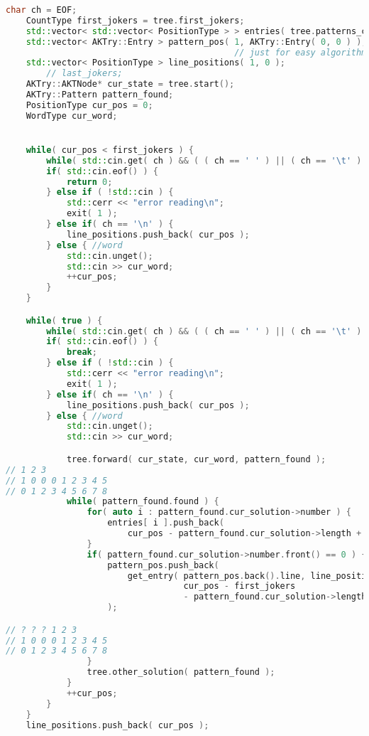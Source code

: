 \begin{lstlisting}[language=C++]
    char ch = EOF;
    CountType first_jokers = tree.first_jokers;
    std::vector< std::vector< PositionType > > entries( tree.patterns_count );
    std::vector< AKTry::Entry > pattern_pos( 1, AKTry::Entry( 0, 0 ) );
                                             // just for easy algorithm
    std::vector< PositionType > line_positions( 1, 0 );
        // last_jokers;
    AKTry::AKTNode* cur_state = tree.start();
    AKTry::Pattern pattern_found;
    PositionType cur_pos = 0;
    WordType cur_word;


    while( cur_pos < first_jokers ) {
        while( std::cin.get( ch ) && ( ( ch == ' ' ) || ( ch == '\t' ) ) );
        if( std::cin.eof() ) {
            return 0;
        } else if ( !std::cin ) {
            std::cerr << "error reading\n";
            exit( 1 );
        } else if( ch == '\n' ) {
            line_positions.push_back( cur_pos );
        } else { //word
            std::cin.unget();
            std::cin >> cur_word;
            ++cur_pos;
        }
    }

    while( true ) {
        while( std::cin.get( ch ) && ( ( ch == ' ' ) || ( ch == '\t' ) ) );
        if( std::cin.eof() ) {
            break;
        } else if ( !std::cin ) {
            std::cerr << "error reading\n";
            exit( 1 );
        } else if( ch == '\n' ) {
            line_positions.push_back( cur_pos );
        } else { //word
            std::cin.unget();
            std::cin >> cur_word;

            tree.forward( cur_state, cur_word, pattern_found );
// 1 2 3
// 1 0 0 0 1 2 3 4 5
// 0 1 2 3 4 5 6 7 8
            while( pattern_found.found ) {
                for( auto i : pattern_found.cur_solution->number ) {
                    entries[ i ].push_back(
                        cur_pos - pattern_found.cur_solution->length + 1 );
                }
                if( pattern_found.cur_solution->number.front() == 0 ) {
                    pattern_pos.push_back(
                        get_entry( pattern_pos.back().line, line_positions,
                                   cur_pos - first_jokers
                                   - pattern_found.cur_solution->length + 1 )
                    );

// ? ? ? 1 2 3
// 1 0 0 0 1 2 3 4 5
// 0 1 2 3 4 5 6 7 8
                }
                tree.other_solution( pattern_found );
            }
            ++cur_pos;
        }
    }
    line_positions.push_back( cur_pos );


\end{lstlisting}
